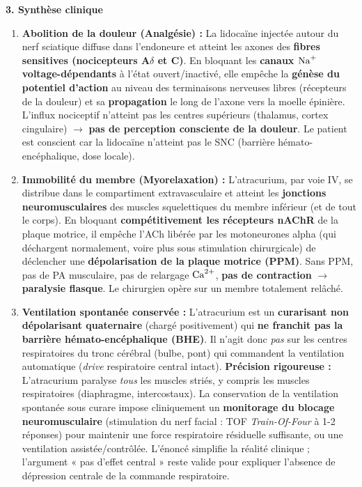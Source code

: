 \documentclass[11pt]{article}
\begin{document}
\begin{exoresolu}
\textbf{3. Synthèse clinique}
\begin{enumerate}
    \item \textbf{Abolition de la douleur (Analgésie) :} La lidocaïne injectée autour du nerf sciatique diffuse dans l'endoneure et atteint les axones des \textbf{fibres sensitives (nocicepteurs A$\delta$ et C)}. En bloquant les \textbf{canaux $\ce{Na+}$ voltage-dépendants} à l'état ouvert/inactivé, elle empêche la \textbf{génèse du potentiel d'action} au niveau des terminaisons nerveuses libres (récepteurs de la douleur) et sa \textbf{propagation} le long de l'axone vers la moelle épinière. L'influx nociceptif n'atteint pas les centres supérieurs (thalamus, cortex cingulaire) $\rightarrow$ \textbf{pas de perception consciente de la douleur}. Le patient est conscient car la lidocaïne n'atteint pas le SNC (barrière hémato-encéphalique, dose locale).
    \item \textbf{Immobilité du membre (Myorelaxation) :} L'atracurium, par voie IV, se distribue dans le compartiment extravasculaire et atteint les \textbf{jonctions neuromusculaires} des muscles squelettiques du membre inférieur (et de tout le corps). En bloquant \textbf{compétitivement les récepteurs nAChR} de la plaque motrice, il empêche l'ACh libérée par les motoneurones alpha (qui déchargent normalement, voire plus sous stimulation chirurgicale) de déclencher une \textbf{dépolarisation de la plaque motrice (PPM)}. Sans PPM, pas de PA musculaire, pas de relargage $\ce{Ca^2+}$, \textbf{pas de contraction} $\rightarrow$ \textbf{paralysie flasque}. Le chirurgien opère sur un membre totalement relâché.
    \item \textbf{Ventilation spontanée conservée :} L'atracurium est un \textbf{curarisant non dépolarisant quaternaire} (chargé positivement) qui \textbf{ne franchit pas la barrière hémato-encéphalique (BHE)}. Il n'agit donc \emph{pas} sur les centres respiratoires du tronc cérébral (bulbe, pont) qui commandent la ventilation automatique (\emph{drive} respiratoire central intact). \textbf{Précision rigoureuse :} L'atracurium paralyse \emph{tous} les muscles striés, y compris les muscles respiratoires (diaphragme, intercostaux). La conservation de la ventilation spontanée sous curare impose cliniquement un \textbf{monitorage du blocage neuromusculaire} (stimulation du nerf facial : TOF \emph{Train-Of-Four} à 1-2 réponses) pour maintenir une force respiratoire résiduelle suffisante, ou une ventilation assistée/contrôlée. L'énoncé simplifie la réalité clinique ; l'argument « pas d'effet central » reste valide pour expliquer l'absence de dépression centrale de la commande respiratoire.

\end{enumerate}
\end{exoresolu}
\end{document}
